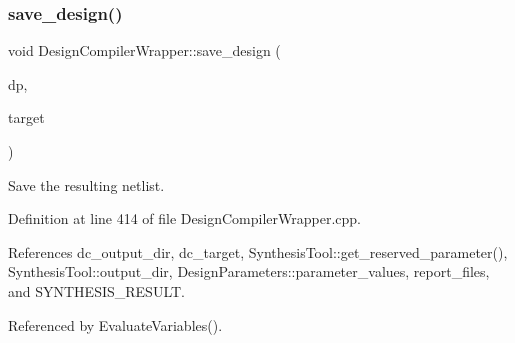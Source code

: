 \subsubsection{\texorpdfstring{save\+\_\+design()}{save\_design()}}
{\footnotesize\ttfamily void Design\+Compiler\+Wrapper\+::save\+\_\+design (\begin{DoxyParamCaption}\item[{const \hyperlink{DesignParameters_8hpp_ae36bb1c4c9150d0eeecfe1f96f42d157}{Design\+Parameters\+Ref}}]{dp,  }\item[{const std\+::string \&}]{target }\end{DoxyParamCaption})\hspace{0.3cm}{\ttfamily [protected]}}



Save the resulting netlist. 



Definition at line 414 of file Design\+Compiler\+Wrapper.\+cpp.



References dc\+\_\+output\+\_\+dir, dc\+\_\+target, Synthesis\+Tool\+::get\+\_\+reserved\+\_\+parameter(), Synthesis\+Tool\+::output\+\_\+dir, Design\+Parameters\+::parameter\+\_\+values, report\+\_\+files, and S\+Y\+N\+T\+H\+E\+S\+I\+S\+\_\+\+R\+E\+S\+U\+LT.



Referenced by Evaluate\+Variables().

